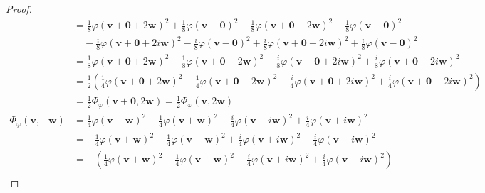 \documentclass[dvipdfmx]{jsarticle}
\begin{document}
\begin{proof}
\begin{align*}
&= \frac{1}{8}{\varphi\left( \mathbf{v} + \mathbf{0} + 2\mathbf{w} \right)}^{2} + \frac{1}{8}{\varphi\left( \mathbf{v} - \mathbf{0} \right)}^{2} - \frac{1}{8}{\varphi\left( \mathbf{v} + \mathbf{0} - 2\mathbf{w} \right)}^{2} - \frac{1}{8}{\varphi\left( \mathbf{v} - \mathbf{0} \right)}^{2} \\
&\quad- \frac{i}{8}{\varphi\left( \mathbf{v} + \mathbf{0} + 2i\mathbf{w} \right)}^{2} - \frac{i}{8}{\varphi\left( \mathbf{v} - \mathbf{0} \right)}^{2} + \frac{i}{8}{\varphi\left( \mathbf{v} + \mathbf{0} - 2i\mathbf{w} \right)}^{2} + \frac{i}{8}{\varphi\left( \mathbf{v} - \mathbf{0} \right)}^{2}\\
&= \frac{1}{8}{\varphi\left( \mathbf{v} + \mathbf{0} + 2\mathbf{w} \right)}^{2} - \frac{1}{8}{\varphi\left( \mathbf{v} + \mathbf{0} - 2\mathbf{w} \right)}^{2} - \frac{i}{8}{\varphi\left( \mathbf{v} + \mathbf{0} + 2i\mathbf{w} \right)}^{2} + \frac{i}{8}{\varphi\left( \mathbf{v} + \mathbf{0} - 2i\mathbf{w} \right)}^{2}\\
&= \frac{1}{2}\left( \frac{1}{4}{\varphi\left( \mathbf{v} + \mathbf{0} + 2\mathbf{w} \right)}^{2} - \frac{1}{4}{\varphi\left( \mathbf{v} + \mathbf{0} - 2\mathbf{w} \right)}^{2} - \frac{i}{4}{\varphi\left( \mathbf{v} + \mathbf{0} + 2i\mathbf{w} \right)}^{2} + \frac{i}{4}{\varphi\left( \mathbf{v} + \mathbf{0} - 2i\mathbf{w} \right)}^{2} \right)\\
&= \frac{1}{2}\varPhi_{\varphi}\left( \mathbf{v} + \mathbf{0},2\mathbf{w} \right) = \frac{1}{2}\varPhi_{\varphi}\left( \mathbf{v},2\mathbf{w} \right) \\
\varPhi_{\varphi}\left( \mathbf{v}, - \mathbf{w} \right) &= \frac{1}{4}{\varphi\left( \mathbf{v} - \mathbf{w} \right)}^{2} - \frac{1}{4}{\varphi\left( \mathbf{v} + \mathbf{w} \right)}^{2} - \frac{i}{4}{\varphi\left( \mathbf{v} - i\mathbf{w} \right)}^{2} + \frac{i}{4}{\varphi\left( \mathbf{v} + i\mathbf{w} \right)}^{2}\\
&= - \frac{1}{4}{\varphi\left( \mathbf{v} + \mathbf{w} \right)}^{2} + \frac{1}{4}{\varphi\left( \mathbf{v} - \mathbf{w} \right)}^{2} + \frac{i}{4}{\varphi\left( \mathbf{v} + i\mathbf{w} \right)}^{2} - \frac{i}{4}{\varphi\left( \mathbf{v} - i\mathbf{w} \right)}^{2}\\
&= - \left( \frac{1}{4}{\varphi\left( \mathbf{v} + \mathbf{w} \right)}^{2} - \frac{1}{4}{\varphi\left( \mathbf{v} - \mathbf{w} \right)}^{2} - \frac{i}{4}{\varphi\left( \mathbf{v} + i\mathbf{w} \right)}^{2} + \frac{i}{4}{\varphi\left( \mathbf{v} - i\mathbf{w} \right)}^{2} \right)\\

\end{align*}
\end{proof}
\end{document}

